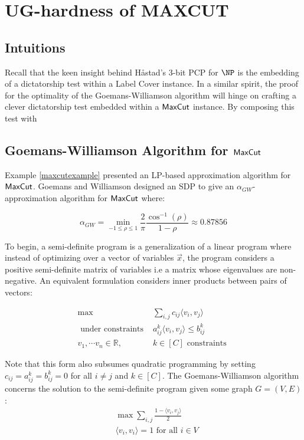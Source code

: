 \section{UG-hardness of MAXCUT}
\subsection{Intuitions}
Recall that the keen insight behind H\aa stad's 3-bit PCP for $\NP$ is the embedding of a dictatorship test within a Label Cover instance. In a similar spirit, the proof for the optimality of the Goemans-Williamson algorithm will hinge on crafting a clever dictatorship test embedded within a $\mathsf{MaxCut}$ instance. By composing this test with

\subsection{Goemans-Williamson Algorithm for $\mathsf{MaxCut}$} \label{goemans}
 Example \ref{maxcutexample} presented an LP-based approximation algorithm for $\mathsf{MaxCut}$. Goemans and Williamson \cite{goemans1995improved} designed an SDP to give an $\alpha_{GW}$-approximation algorithm for $\mathsf{MaxCut}$ where:

\begin{equation}
  \alpha_{GW} = \min_{-1 \leq \rho \leq 1} \frac{2}{\pi}\frac{\cos^{-1}(\rho)}{1 - \rho} \approx 0.87856
\end{equation}

To begin, a semi-definite program is a generalization of a linear program where instead of optimizing over a vector of variables $\vec{x}$, the program considers a positive semi-definite matrix of variables i.e a matrix whose eigenvalues are non-negative. An equivalent formulation considers inner products between pairs of vectors:

\begin{align*}
     \max & \sum_{i,j} c_{ij}\langle v_i, v_j \rangle \\
     \text{ under constraints }& a_{ij}^k\langle v_i, v_j \rangle \leq b_{ij}^k \\
     v_1, \cdots v_n \in \mathbb{R}, \quad & k \in [C] \text{ constraints }
\end{align*}

Note that this form also subsumes quadratic programming by setting $c_{ij} = a_{ij}^k = b_{ij}^k = 0$ for all $i \neq j$ and $k \in [C]$. The Goemans-Williamson algorithm concerns the solution to the semi-definite program given some graph $G = (V,E)$: \newline
%
\begin{align}
  & \max \sum_{i,j} \frac{1 - \langle v_i, v_j \rangle}{2} \\
  & \langle v_i, v_i \rangle = 1 \text{ for all } i \in V
\end{align}

